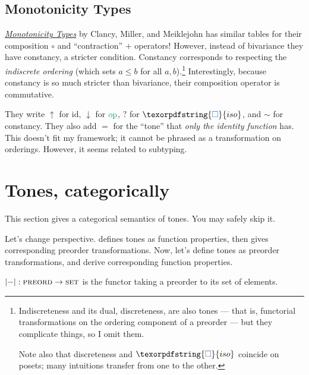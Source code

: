 \documentclass[ribbons]{rntz}
\newcommand{\cat}[1]{\textsc{#1}} %
\newcommand{\Pre}{\cat{preord}}
\newcommand{\Set}{\cat{set}}
\newcommand\opcolor{\color{ForestGreen}}
\newcommand\isocolor{\color{NavyBlue}}
\newcommand\id{\ensuremath{\mathrm{id}}}
\newcommand\op{\ensuremath{\mathrm{\opcolor op}}}
\newcommand\iso{\texorpdfstring{\ensuremath{{\isocolor\Box}}}{iso}}
\begin{document}
\subsection{Monotonicity Types}

\href{https://infoscience.epfl.ch/record/231867/files/monotonicity-types.pdf}{\emph{Monotonicity
    Types}} by Clancy, Miller, and Meiklejohn has similar tables for their
composition $\circ$ and ``contraction'' $+$ operators! However, instead of
bivariance they have constancy, a stricter condition.
%
Constancy corresponds to respecting the \emph{indiscrete ordering} (which sets
$a \le b$ for all $a,b$).\footnote{Indiscreteness and its dual, discreteness,
  are also tones --- that is, functorial transformations on the ordering
  component of a preorder --- but they complicate things, so I omit them.

  Note also that discreteness and $\iso$ coincide on posets; many intuitions
  transfer from one to the other.}
%
Interestingly, because constancy is so much stricter than bivariance, their
composition operator is commutative.

They write $\uparrow$ for $\id$, $\downarrow$ for $\op$, $?$ for $\iso$, and
$\sim$ for constancy. They also add $=$ for the ``tone'' that \emph{only the
  identity function} has. This doesn't fit my framework; it cannot be phrased as
a transformation on orderings. However, it seems related to subtyping.



\section{Tones, categorically}

\newcommand{\elems}[1]{\ensuremath{|{#1}|}}
\newcommand{\elemsfn}[0]{\elems{-}}


This section gives a categorical semantics of tones. You may safely skip it.

Let's change perspective.  defines tones as function
pro\-per\-ties, then gives corresponding pre\-order trans\-form\-ations. Now,
let's define tones as preorder transformations, and derive corresponding
function properties.

\begin{definition}
  $\elemsfn : \Pre \to \Set$ is the functor taking a preorder to its set of
  elements.
\end{definition}
\end{document}
